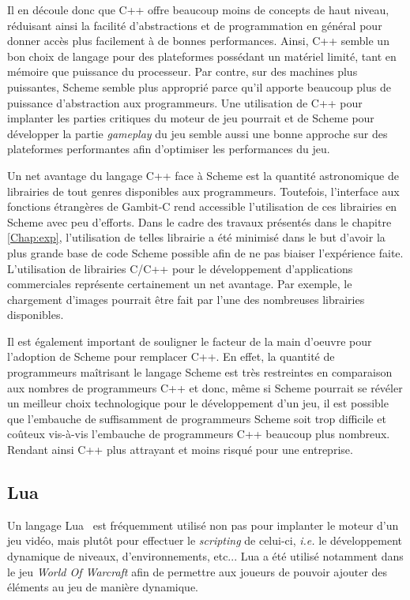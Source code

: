 \documentclass[12pt,oneside,letterpaper,francais]{book}
\newcommand{\ie}{{\textit{i.e. }}}
\begin{document}
Il en découle donc que C++ offre beaucoup moins de concepts de haut
niveau, réduisant ainsi la facilité d'abstractions et de programmation
en général pour donner accès plus facilement à de bonnes
performances. Ainsi, C++ semble un bon choix de langage pour des
plateformes possédant un matériel limité, tant en mémoire que
puissance du processeur. Par contre, sur des machines plus puissantes,
Scheme semble plus approprié parce qu'il apporte beaucoup plus de
puissance d'abstraction aux programmeurs. Une utilisation de C++ pour
implanter les parties critiques du moteur de jeu pourrait et de Scheme
pour développer la partie \textit{gameplay} du jeu semble aussi une
bonne approche sur des plateformes performantes afin d'optimiser les
performances du jeu.

Un net avantage du langage C++ face à Scheme est la quantité
astronomique de librairies de tout genres disponibles aux
programmeurs. Toutefois, l'interface aux fonctions étrangères de
Gambit-C rend accessible l'utilisation de ces librairies en Scheme
avec peu d'efforts. Dans le cadre des travaux présentés dans le
chapitre \ref{Chap:exp}, l'utilisation de telles librairie a été
minimisé dans le but d'avoir la plus grande base de code Scheme
possible afin de ne pas biaiser l'expérience faite. L'utilisation de
librairies C/C++ pour le développement d'applications commerciales
représente certainement un net avantage. Par exemple, le chargement
d'images pourrait être fait par l'une des nombreuses librairies
disponibles.

Il est également important de souligner le facteur de la main d'oeuvre
pour l'adoption de Scheme pour remplacer C++. En effet, la quantité de
programmeurs maîtrisant le langage Scheme est très restreintes en
comparaison aux nombres de programmeurs C++ et donc, même si Scheme
pourrait se révéler un meilleur choix technologique pour le
développement d'un jeu, il est possible que l'embauche de suffisamment
de programmeurs Scheme soit trop difficile et coûteux vis-à-vis
l'embauche de programmeurs C++ beaucoup plus nombreux. Rendant ainsi
C++ plus attrayant et moins risqué pour une entreprise.


\subsection{Lua}

Un langage Lua~\cite{Lua} est fréquemment utilisé non pas pour
implanter le moteur d'un jeu vidéo, mais plutôt pour effectuer le
\textit{scripting} de celui-ci, \ie le développement dynamique de
niveaux, d'environnements, etc... Lua a été utilisé notamment dans le
jeu \textit{World Of Warcraft} afin de permettre aux joueurs de
pouvoir ajouter des éléments au jeu de manière dynamique.
\end{document}
